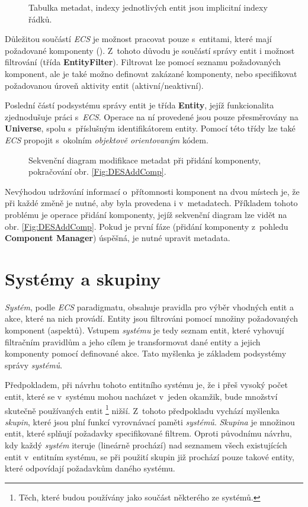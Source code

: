 \begin{figure}
	\caption{Tabulka metadat, indexy jednotlivých entit jsou implicitní indexy řádků.}
	\label{Fig:DESMetadata}
\end{figure}

Důležitou součástí \emph{ECS} je možnost pracovat pouze s~entitami, které mají požadované komponenty (). Z~tohoto důvodu je součástí správy entit i možnost filtrování (třída \textbf{EntityFilter}). Filtrovat lze pomocí seznamu požadovaných komponent, ale je také možno definovat zakázané komponenty, nebo specifikovat požadovanou úroveň aktivity entit (aktivní/neaktivní).

Poslední částí podsystému správy entit je třída \textbf{Entity}, jejíž funkcionalita zjednodušuje práci s~\emph{ECS}. Operace na ní provedené jsou pouze přesměrovány na \textbf{Universe}, spolu s~příslušným identifikátorem entity. Pomocí této třídy lze také \emph{ECS} propojit s~okolním \emph{objektově orientovaným} kódem.

\begin{figure}[H]
	\centering
	\caption{Sekvenční diagram modifikace metadat při přidání komponenty, pokračování obr. \ref{Fig:DESAddComp}.}
	\label{Fig:DESAddEnt}
\end{figure}

Nevýhodou udržování informací o~přítomnosti komponent na dvou místech je, že při každé změně je nutné, aby byla provedena i v~metadatech. Příkladem tohoto problému je operace přidání komponenty, jejíž sekvenční diagram lze vidět na obr. \ref{Fig:DESAddComp}. Pokud je první fáze (přidání komponenty z~pohledu \textbf{Component Manager}) úspěšná, je nutné upravit metadata.

\section{Systémy a skupiny}
\label{Chap:SysGroup}

\emph{Systém}, podle \emph{ECS} paradigmatu, obsahuje pravidla pro výběr vhodných entit a akce, které na nich provádí. Entity jsou filtrováni pomocí množiny požadovaných komponent (aspektů). Vstupem \emph{systému} je tedy seznam entit, které vyhovují filtračním pravidlům a jeho cílem je transformovat dané entity a jejich komponenty pomocí definované akce. Tato myšlenka je základem podsystémy správy \emph{systémů}. 

Předpokladem, při návrhu tohoto entitního systému je, že i přeš vysoký počet entit, které se v~systému mohou nacházet v~jeden okamžik, bude množství skutečně používaných entit \footnote{Těch, které budou používány jako součást některého ze systémů.} nižší. Z~tohoto předpokladu vychází myšlenka \emph{skupin}, které jsou plní funkcí vyrovnávací paměti \emph{systémů}. \emph{Skupina} je množinou entit, které splňují požadavky specifikované filtrem. Oproti původnímu návrhu, kdy každý \emph{systém} iteruje (lineárně prochází) nad seznamem všech existujících entit v~entitním systému, se při použití skupin již prochází pouze takové entity, které odpovídají požadavkům daného systému.


